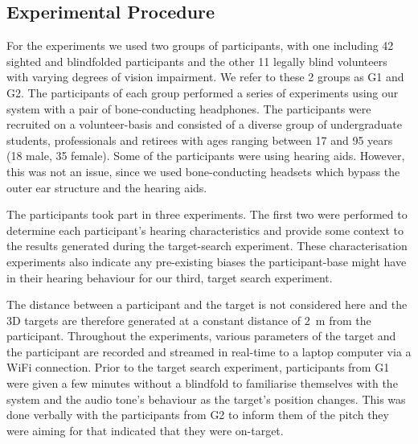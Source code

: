 \documentclass[sigconf, review=true, screen=true, anonymous=true]{acmart}
\begin{document}
\subsection{Experimental Procedure}

For the experiments we used two groups of participants, with one including 42 sighted and blindfolded participants and the other 11 legally blind volunteers with varying degrees of vision impairment. We refer to these 2 groups as G1 and G2.
The participants of each group performed a series of experiments using our system with a pair of bone-conducting headphones.
The participants were recruited on a volunteer-basis and consisted of a diverse group of undergraduate students, professionals and retirees with ages ranging between 17 and 95 years (18 male, 35 female).
Some of the participants were using hearing aids.
However, this was not an issue, since we used bone-conducting headsets which bypass the outer ear structure and the hearing aids.

The participants took part in three experiments.
The first two were performed to determine each participant's hearing characteristics and provide some context to the results generated during the target-search experiment.
These characterisation experiments also indicate any pre-existing biases the participant-base might have in their hearing behaviour for our third, target search experiment. 


The distance between a participant and the target is not considered here and the 3D targets are therefore generated at a constant distance of \SI{2}{\metre} from the participant.
Throughout the experiments, various parameters of the target and the participant are recorded and streamed in real-time to a laptop computer via a WiFi connection.
Prior to the target search experiment, participants from G1 were given a few minutes without a blindfold to familiarise themselves with the system and the audio tone's behaviour as the target's position changes.
This was done verbally with the participants from G2 to inform them of the pitch they were aiming for that indicated that they were on-target. 
\end{document}
